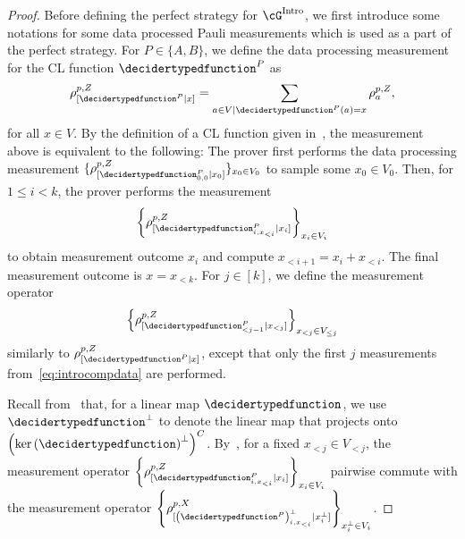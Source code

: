 \begin{proof}
	
	Before defining the perfect strategy for $\cG^{\text{Intro}}$, we first introduce some notations for some data processed Pauli measurements which is used as a part of the perfect strategy. For $P \in \{A,B\}$, we define the data processing measurement for the CL function $\decidertypedfunction^{P}$ as 
	\begin{equation*}
		\rho^{p, Z}_{[\decidertypedfunction^{P}|x]} = \sum_{a \in V| \decidertypedfunction^{P}(a) = x} \rho^{p, Z}_{a}, 
	\end{equation*}
	for all $x \in V$. By the definition of a CL function given in~, the measurement above is equivalent to the following: The prover first performs the data processing measurement $\{\rho^{p, Z}_{[\decidertypedfunction^{P}_{0,0}|x_0]}\}_{x_0 \in V_0}$ to sample some $x_0 \in V_0$. Then, for $1 \leq i < k$, the prover performs the measurement 
	\begin{equation}\label{eq:introcompdata}
		\left\{\rho^{p, Z}_{[\decidertypedfunction^{P}_{i,x_{< i}}|x_i]} \right\}_{x_i \in V_i}
	\end{equation}
	to obtain measurement outcome $x_i$ and compute $x_{< i+1} = x_i + x_{< i}$. The final measurement outcome is $x =  x_{< k}$. For $j \in [k]$, we define the measurement operator 
	\begin{equation} \label{eq:introcomp1}
		\left\{\rho^{p, Z}_{[\decidertypedfunction^{P}_{< j-1}|x_{< j}]}\right\}_{x_{< j} \in V_{\leq j}}
	\end{equation}
	similarly to $\rho^{p, Z}_{[\decidertypedfunction^{P}|x]}$, except that only the first $j$ measurements from~\eqref{eq:introcompdata} are performed. 
	
	Recall from~ that, for a linear map $\decidertypedfunction$, we use $\decidertypedfunction^{\bot}$ to denote the linear map that projects onto $\left(\ker{(\decidertypedfunction)}^{\bot}\right)^{C}$. By~, for a fixed $x_{< j} \in V_{< j}$, the measurement operator $\left\{\rho^{p, Z}_{[\decidertypedfunction^{P}_{i,x_{< i}}|x_i]} \right\}_{x_i \in V_i}$ pairwise commute with the measurement operator $\left\{\rho^{p, X}_{[\left(\decidertypedfunction^{P}\right)^{\bot}_{i,x_{< i}}|x_i^{\bot}]} \right\}_{x_i^{\bot} \in V_i}$. 
	

\end{proof}
